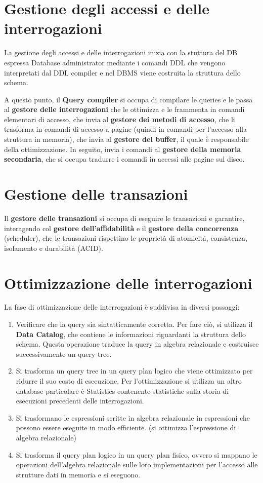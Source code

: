 \section{Gestione degli accessi e delle interrogazioni}
La gestione degli accessi e delle interrogazioni inizia con la stuttura del DB
espressa Database administrator mediante i comandi DDL che vengono interpretati 
dal DDL compiler e nel DBMS viene costruita la struttura dello schema.

A questo punto, il \textbf{Query compiler} si occupa di compilare le queries e le 
passa al \textbf{gestore delle interrogazioni} che le ottimizza e le frammenta in 
comandi elementari di accesso, che invia al \textbf{gestore dei metodi di accesso}, che li trasforma
in comandi di accesso a pagine (quindi in comandi per l'accesso alla struttura in memoria), 
che invia al \textbf{gestore del buffer}, il
quale è responsabile della ottimizzazione. In seguito, invia i comandi al
\textbf{gestore della memoria secondaria}, che si occupa tradurre i comandi in
accessi alle pagine sul disco.

\section{Gestione delle transazioni}
Il \textbf{gestore delle transazioni} si occupa di eseguire le transazioni e
garantire, interagendo col \textbf{gestore dell'affidabilità}
e il \textbf{gestore della concorrenza} (scheduler), che le transazioni rispettino le
proprietà di atomicità, consistenza, isolamento e durabilità (ACID).
\section{Ottimizzazione delle interrogazioni}
La fase di ottimizzazione delle interrogazioni è suddivisa in diversi passaggi:
\begin{enumerate}
    \item Verificare che la query sia sintatticamente corretta. Per fare ciò,
          si utilizza il \textbf{Data Catalog}, che contiene le informazioni
          riguardanti la struttura dello schema.
          Questa operazione traduce la query in algebra relazionale e costruisce
          successivamente un query tree.
    \item Si trasforma un query tree in un query plan logico che viene ottimizzato
          per ridurre il suo costo di esecuzione. Per l'ottimizzazione si utilizza un altro
          database particolare è Statistics contenente statistiche sulla storia
          di esecuzioni precedenti delle interrogazioni.
    \item Si trasformano le espressioni scritte in algebra relazionale in
          espressioni che possono essere eseguite in modo efficiente. (si ottimizza l'espressione di algebra relazionale)
    \item Si trasforma il query plan logico in un query plan fisico, ovvero
          si mappano le operazioni dell'algebra relazionale sulle loro 
          implementazioni per l'accesso alle strutture dati in memoria e si eseguono.
\end{enumerate}

